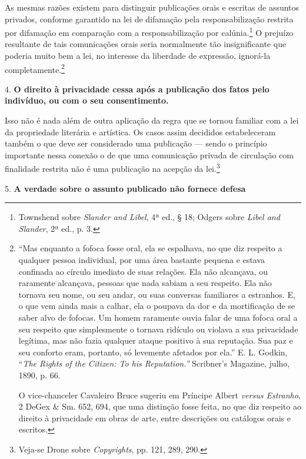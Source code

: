 As mesmas razões existem para distinguir publicações orais e escritas de
assuntos privados, conforme garantido na lei de difamação pela
responsabilização restrita por difamação em comparação com a
responsabilização por calúnia.\footnote{Townshend sobre \emph{Slander
  and Libel}, 4ª ed., § 18; Odgers sobre \emph{Libel and Slander}, 2ª
  ed., p. 3.} O prejuízo resultante de tais comunicações orais seria
normalmente tão insignificante que poderia muito bem a lei, no interesse
da liberdade de expressão, ignorá-la completamente.\footnote{``Mas
  enquanto a fofoca fosse oral, ela se espalhava, no que diz respeito a
  qualquer pessoa individual, por uma área bastante pequena e estava
  confinada ao círculo imediato de suas relações. Ela não alcançava, ou
  raramente alcançava, pessoas que nada sabiam a seu respeito. Ela não
  tornava seu nome, ou seu andar, ou suas conversas familiares a
  estranhos. E, o que vem ainda mais a calhar, ela o poupava da dor e da
  mortificação de se saber alvo de fofocas. Um homem raramente ouvia
  falar de uma fofoca oral a seu respeito que simplesmente o tornava
  ridículo ou violava a sua privacidade legítima, mas não fazia qualquer
  ataque positivo à sua reputação. Sua paz e seu conforto eram,
  portanto, só levemente afetados por ela.'' E. L. Godkin, ``\emph{The
  Rights of the Citizen: To his Reputation.''} Scribner's Magazine,
  julho, 1890, p. 66.

  O vice-chanceler Cavaleiro Bruce sugeriu em Príncipe Albert
  \emph{versus Estranho}, 2 DeGex \& Sm. 652, 694, que uma distinção
  fosse feita, no que diz respeito ao direito à privacidade em obras de
  arte, entre descrições ou catálogos orais e escritos.}

4. \textbf{O direito à privacidade cessa após a publicação dos fatos
pelo indivíduo, ou com o seu consentimento.}

Isso não é nada além de outra aplicação da regra que se tornou familiar
com a lei da propriedade literária e artística. Os casos assim decididos
estabeleceram também o que deve ser considerado uma publicação --- sendo
o princípio importante nessa conexão o de que uma comunicação privada de
circulação com finalidade restrita não é uma publicação na acepção da
lei.\footnote{Veja-se Drone sobre \emph{Copyrights}, pp. 121, 289, 290.}

5. \textbf{A verdade sobre o assunto publicado não fornece defesa}

